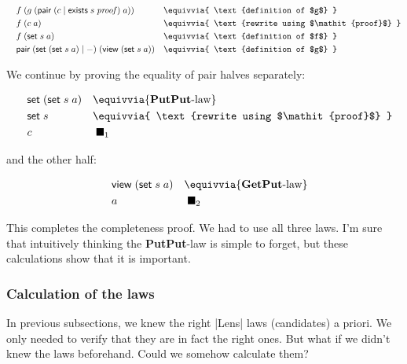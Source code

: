 \documentclass{article}
\begin{document}
\begin{equation}
\begin{aligned}
\quad &f\; (g\; (\mathsf{pair}\;(c \mid \mathsf{exists}\; s\; \mathit{proof})\;a)) &&\equivvia{ \text{definition of $g$} } \\
      &f\; (c\; a) &&\equivvia{ \text{rewrite using $\mathit{proof}$} } \\
      &f\; (\mathsf{set}\;s\; a) &&\equivvia{ \text{definition of $f$} } \\
      &\mathsf{pair}\; (\mathsf{set}\; (\mathsf{set}\;s\; a) \mid -)\;(\mathsf{view}\;(\mathsf{set}\;s\;a)) &&\equivvia{ \text{definition of $g$} } \\
\end{aligned}
\end{equation}

We continue by proving the equality of pair halves separately:

\begin{equation}
\begin{aligned}
\quad &\mathsf{set}\; (\mathsf{set}\;s\; a)  &&\equivvia{ \text{\textbf{PutPut}-law} }  \\
      &\mathsf{set}\;s  &&\equivvia{ \text{rewrite using $\mathit{proof}$} }  \\
      &c &&\;\blacksquare_1
\end{aligned}
\end{equation}

and the other half:

\begin{equation}
\begin{aligned}
\quad &\mathsf{view}\;(\mathsf{set}\;s\;a) &&\equivvia{ \text{\textbf{GetPut}-law} }  \\
      &a &&\;\blacksquare_2
\end{aligned}
\end{equation}

This completes the completeness proof. We had to use all three laws.
I'm sure that intuitively thinking the \textbf{PutPut}-law is simple to forget,
but these calculations show that it is important.

\subsubsection{Calculation of the laws}

In previous subsections, we knew the right |Lens| laws (candidates) a priori.
We only needed to verify that they are in fact the right ones.
But what if we didn't knew the laws beforehand.
Could we somehow calculate them?
\end{document}
